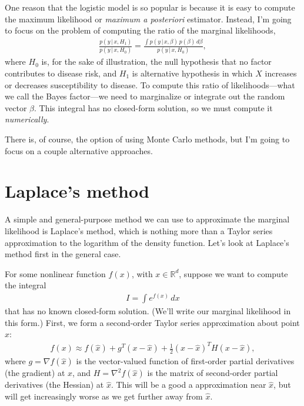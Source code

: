 \documentclass[final]{siamltex}
\newcommand{\half}{{\textstyle\frac{1}{2}}}
\newcommand{\smint}{\textstyle\int}
\begin{document}
One reason that the logistic model is so popular is because it is easy
to compute the maximum likelihood or {\em maximum a posteriori}
estimator. Instead, I'm going to focus on the problem of computing the
ratio of the marginal likelihoods,
\begin{align*}
\frac{p(y \,|\, x, H_1)}
     {p(y \,|\, x, H_0)} = 
\frac{\int p(y \,|\, x, \beta) \, p(\beta) \, d\beta}
     {p(y \,|\, x, H_0)},
\end{align*}
where $H_0$ is, for the sake of illustration, the null hypothesis that
no factor contributes to disease risk, and $H_1$ is alternative
hypothesis in which $X$ increases or decreases susceptibility to
disease. To compute this ratio of likelihoods---what we call the Bayes
factor---we need to marginalize or integrate out the random vector
$\beta$. This integral has no closed-form solution, so we must compute
it {\em numerically}.

There is, of course, the option of using Monte Carlo methods, but I'm
going to focus on a couple alternative approaches.

\section*{Laplace's method}

A simple and general-purpose method we can use to approximate the
marginal likelihood is Laplace's method, which is nothing more than a
Taylor series approximation to the logarithm of the density
function. Let's look at Laplace's method first in the general case.

For some nonlinear function $f(x)$, with $x \in \mathbb{R}^d$, suppose
we want to compute the integral
\begin{align*}
I = \smint e^{f(x)} \, dx
\end{align*}
that has no known closed-form solution. (We'll write our marginal
likelihood in this form.) First, we form a second-order Taylor series
approximation about point $\hat{x}$:
\begin{align*}
f(x) \approx f(\hat{x}) + g^T(x - \hat{x}) + \half(x - \hat{x})^TH(x-\hat{x}),
\end{align*}
where $g = \nabla f(\hat{x})$ is the vector-valued function of
first-order partial derivatives (the gradient) at $\hat{x}$, and $H =
\nabla^2 f(\hat{x})$ is the matrix of second-order partial derivatives
(the Hessian) at $\hat{x}$. This will be a good a approximation near
$\hat{x}$, but will get increasingly worse as we get further away from
$\hat{x}$.
\end{document}
